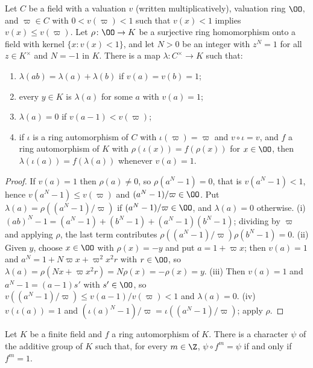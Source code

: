 \begin{lemma}\label{pf:llc:log}
Let $C$ be a field with a valuation $v$ (written multiplicatively), valuation ring $\OO$, and $\varpi\in C$ with
$0<v(\varpi)<1$ such that $v(x)<1$ implies $v(x)\le v(\varpi)$. Let $\rho\colon\OO\to K$ be a surjective ring homomorphism
onto a field with kernel $\{x:v(x)<1\}$, and let $N>0$ be an integer with $z^N=1$ for all $z\in K^\times$ and $N=-1$ in
$K$. There is a map $\lambda\colon C^\times\to K$ such that:
\begin{enumerate}[label=(\roman*)]
\item $\lambda(ab)=\lambda(a)+\lambda(b)$ if $v(a)=v(b)=1$;
\item every $y\in K$ is $\lambda(a)$ for some $a$ with $v(a)=1$;
\item $\lambda(a)=0$ if $v(a-1)<v(\varpi)$;
\item if $\iota$ is a ring automorphism of $C$ with $\iota(\varpi)=\varpi$ and $v\circ\iota=v$, and $f$ a ring automorphism of
  $K$ with $\rho(\iota(x))=f(\rho(x))$ for $x\in\OO$, then $\lambda(\iota(a))=f(\lambda(a))$ whenever $v(a)=1$.
\end{enumerate}
\end{lemma}

\begin{proof}
If $v(a)=1$ then $\rho(a)\ne0$, so $\rho(a^N-1)=0$, that is $v(a^N-1)<1$, hence $v(a^N-1)\le v(\varpi)$ and
$(a^N-1)/\varpi\in\OO$. Put $\lambda(a)=\rho((a^N-1)/\varpi)$ if $(a^N-1)/\varpi\in\OO$, and $\lambda(a)=0$ otherwise.
(i) $(ab)^N-1=(a^N-1)+(b^N-1)+(a^N-1)(b^N-1)$; dividing by $\varpi$ and applying $\rho$, the last term contributes
$\rho((a^N-1)/\varpi)\rho(b^N-1)=0$. (ii) Given $y$, choose $x\in\OO$ with $\rho(x)=-y$ and put $a=1+\varpi x$; then $v(a)=1$
and $a^N=1+N\varpi x+\varpi^2x^2r$ with $r\in\OO$, so $\lambda(a)=\rho(Nx+\varpi x^2r)=N\rho(x)=-\rho(x)=y$. (iii) Then
$v(a)=1$ and $a^N-1=(a-1)s'$ with $s'\in\OO$, so $v((a^N-1)/\varpi)\le v(a-1)/v(\varpi)<1$ and $\lambda(a)=0$. (iv)
$v(\iota(a))=1$ and $(\iota(a)^N-1)/\varpi=\iota((a^N-1)/\varpi)$; apply $\rho$.
\end{proof}

\begin{lemma}\label{pf:llc:addchar}
Let $K$ be a finite field and $f$ a ring automorphism of $K$. There is a character $\psi$ of the additive group of $K$
such that, for every $m\in\Z$, $\psi\circ f^m=\psi$ if and only if $f^m=1$.
\end{lemma}

